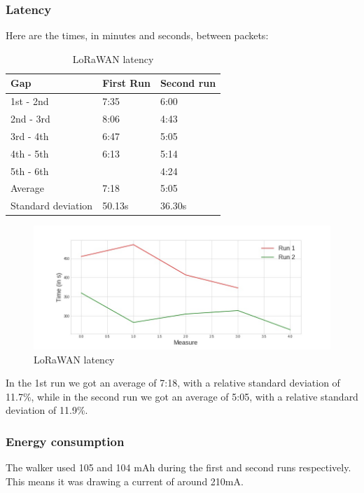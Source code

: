 		\subsubsection{Latency}
			Here are the times, in minutes and seconds, between packets:
			\begin{table}[h]
				\begin{tabular}{@{}lll@{}}
					\toprule
					\textbf{Gap}&\textbf{First Run}& \textbf{Second run} 	 \\ \midrule
					1st - 2nd 			&	7:35		& 	6:00     	 \\
					2nd - 3rd 			&	8:06    	& 	4:43         \\
					3rd - 4th 			&	6:47		& 	5:05         \\
					4th - 5th 			&	6:13    	& 	5:14         \\
					5th - 6th 			&	         	& 	4:24         \\ \bottomrule
					Average     		&   7:18        &   5:05		 \\
					Standard deviation  &   50.13s      &   36.30s		 \\ \bottomrule
				\end{tabular}
				\caption[LoRaWAN latency]{LoRaWAN latency}
				\label{tab:Latency}
			\end{table}
		
			\begin{figure}[h]
				\centering
				\includegraphics[width=1.1\linewidth]{gfx/latency_diff.jpg}
				\caption{LoRaWAN latency}
				\label{fig:Latency}
			\end{figure}

			In the 1st run we got an average of 7:18, with a relative standard deviation of 11.7\%, while in the second run we got an average of 5:05, with a relative standard deviation of 11.9\%.

		\subsubsection{Energy consumption}
			The walker used 105 and 104 mAh during the first and second runs respectively. This means it was drawing a current of around 210mA.

